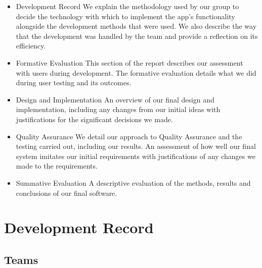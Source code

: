 \documentclass[12pt,a4paper]{article}
\begin{document}
      \begin{itemize}
        \item {Development Record}
          We explain the methodology used by our group to decide the technology with which to implement the app’s functionality alongside the development methods that were used. We also describe the way that the development was handled by the team and provide a reflection on its efficiency.

        \item {Formative Evaluation}
          This section of the report describes our assessment with users during development. The formative evaluation details what we did during user testing and its outcomes.

        \item { Design and Implementation }
          An overview of our final design and implementation, including any changes from our initial ideas with justifications for the significant decisions we made.

        \item { Quality Assurance}
          We detail our approach to Quality Assurance and the testing carried out, including our results. An assessment of how well our final system imitates our initial requirements with justifications of any changes we made to the requirements.

        \item { Summative Evaluation}
          A descriptive evaluation of the methods, results and conclusions of our final software.
      \end{itemize}

    \section{Development Record}
      \subsection{Teams} 
\end{document}
